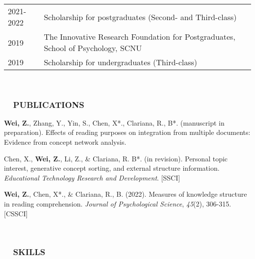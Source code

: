 \documentclass[a4paper, 12pt]{article}
\begin{document}
\begin{tabularx}{\textwidth}{p{2cm} X}

    2021-2022 & Scholarship for postgraduates (Second- and Third-class)\\

    2019 & The Innovative Research Foundation for Postgraduates, School of Psychology, SCNU \\
    
    2019 & Scholarship for undergraduates (Third-class)
    
\end{tabularx}

\  \par


\subsubsection*{ \ \ PUBLICATIONS}

\begin{description}
    
    \item \textbf{Wei, Z.}, Zhang, Y., Yin, S., Chen, X*., Clariana, R., B*. (manuscript in preparation). Effects of reading purposes on integration from multiple documents: Evidence from concept network analysis.

    \item Chen, X., \textbf{Wei, Z.}, Li, Z., \& Clariana, R. B*. (in revision). Personal topic interest, generative concept sorting, and external structure information. \textit{Educational Technology Research and Development}. [SSCI]

    \item \textbf{Wei, Z.}, Chen, X*., \& Clariana, R., B. (2022). Measures of knowledge structure in reading comprehension. \textit{Journal of Psychological Science}, \textit{45}(2), 306-315. [CSSCI]

    
    \end{description}

\  \par


\subsubsection*{ \ \ SKILLS}
\end{document}
